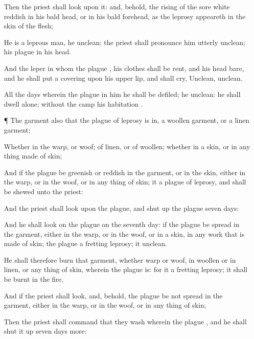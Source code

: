 {Then the
priest shall
look upon it: and, behold,
{} the
rising of the
sore
{}
white
reddish in his bald
head, or in his bald
forehead, as the
leprosy
appeareth in the
skin of the
flesh;

He is a
leprous
man, he
{}
unclean: the
priest shall pronounce him
utterly
unclean; his
plague
{} in his
head.

And the
leper in whom the
plague
{}, his
clothes shall be
rent, and his
head
bare, and he shall put a
covering upon his upper
lip, and shall
cry,
Unclean,
unclean.

All the
days wherein the
plague
{} in him he shall be
defiled; he
{}
unclean: he shall
dwell
alone;
without the
camp
{} his
habitation
{}.


\par }{\PP {}¶ The
garment also that the
plague of
leprosy is in,
{} a
woollen
garment, or a
linen
garment;

Whether
{} in the
warp, or
woof; of
linen, or of
woollen; whether in a
skin, or in any thing
made of
skin;

And if the
plague be
greenish or
reddish in the
garment, or in the
skin,
either in the
warp, or in the
woof, or in any
thing of
skin; it
{} a
plague of
leprosy, and shall be
shewed unto the
priest:

And the
priest shall
look upon the
plague, and
shut up
{} the
plague
seven
days:

And he shall
look on the
plague on the
seventh
day: if the
plague be
spread in the
garment, either in the
warp, or in the
woof, or in a
skin,
{} in any
work that is
made of
skin; the
plague
{} a
fretting
leprosy; it
{}
unclean.

He shall therefore
burn that
garment, whether
warp or
woof, in
woollen or in
linen, or any
thing of
skin, wherein the
plague is: for it
{} a
fretting
leprosy; it shall be
burnt in the
fire.

And if the
priest shall
look, and, behold, the
plague be not
spread in the
garment,
either in the
warp,
or in the
woof,
or in any
thing of
skin;

Then the
priest shall
command that they
wash
{} wherein the
plague
{}, and he shall
shut it up
seven
days
more:

}
